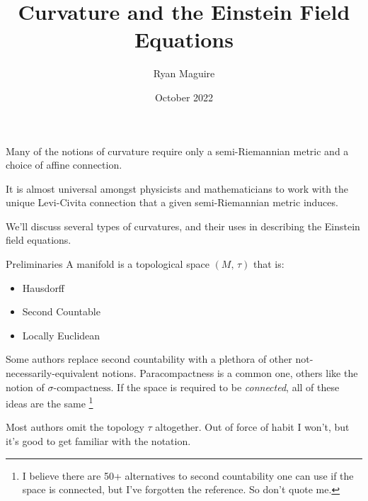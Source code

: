 \documentclass{beamer}
\title{Curvature and the Einstein Field Equations}
\author{Ryan Maguire}
\date{October 2022}
\begin{document}
    \maketitle
    \begin{frame}
        Many of the notions of curvature require only a semi-Riemannian metric
        and a choice of affine connection.
        \par\hfill\par
        It is almost universal amongst physicists and mathematicians to work
        with the unique Levi-Civita connection that a given semi-Riemannian
        metric induces.
        \par\hfill\par
        We'll discuss several types of curvatures, and their uses in
        describing the Einstein field equations.
    \end{frame}
    \begin{frame}{Preliminaries}
        A manifold is a topological space $(M,\,\tau)$ that is:
        \begin{itemize}
            \item Hausdorff
            \item Second Countable
            \item Locally Euclidean
        \end{itemize}
        Some authors replace second countability with a plethora of other
        not-necessarily-equivalent notions. Paracompactness is a common one,
        others like the notion of $\sigma\textrm{-compactness}$. If the space
        is required to be \textit{connected}, all of these ideas are the same%
        \footnote{I believe there are 50+ alternatives to second countability
                  one can use if the space is connected, but I've forgotten the
                  reference. So don't quote me.}
        \par\hfill\par
        Most authors omit the topology $\tau$ altogether. Out of force of habit
        I won't, but it's good to get familiar with the notation.
    \end{frame}
\end{document}
